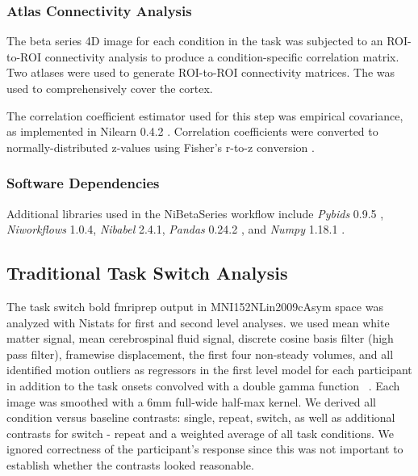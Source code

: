\documentclass[10pt,letterpaper]{article}
\begin{document}
\hypertarget{atlas-connectivity-analysis}{%
\subsubsection{Atlas Connectivity
Analysis}\label{atlas-connectivity-analysis}}

The beta series 4D image for each condition in the task was subjected to
an ROI-to-ROI connectivity analysis to produce a condition-specific
correlation matrix.
Two atlases were used to generate ROI-to-ROI connectivity matrices.
The \cite[Schaefer Atlas (400 parcels, 17 networks)]{Schaefer2017} was
used to comprehensively cover the cortex.

The correlation coefficient estimator used for this
step was empirical covariance, as implemented in Nilearn 0.4.2
\cite{Abraham2014}. Correlation coefficients were converted to
normally-distributed z-values using Fisher's r-to-z conversion
\cite{Fisher1915}.

\hypertarget{software-dependencies}{%
\subsubsection{Software Dependencies}\label{software-dependencies}}

Additional libraries used in the NiBetaSeries workflow include
\emph{Pybids} 0.9.5 \cite{Yarkoni2019}, \emph{Niworkflows} 1.0.4,
\emph{Nibabel} 2.4.1, \emph{Pandas} 0.24.2 \cite{McKinney2010}, and
\emph{Numpy} 1.18.1 \cite{VanDerWalt2011, Oliphant2006}.

\subsection*{Traditional Task Switch Analysis}
The task switch bold fmriprep output in MNI152NLin2009cAsym space
was analyzed with Nistats for first and second level analyses.
we used mean white matter signal, mean cerebrospinal fluid signal,
discrete cosine basis filter (high pass filter), framewise displacement, the first four non-steady volumes, and
all identified motion outliers as regressors in the first level model for each participant
in addition to the task onsets convolved with a double gamma function ~\cite{Glover1999}.
Each image was smoothed with a 6mm full-wide half-max kernel.
We derived all condition versus baseline contrasts: single, repeat, switch, as well as
additional contrasts for switch - repeat and a weighted average of all task conditions.
We ignored correctness of the participant's response since this was not important to
establish whether the contrasts looked reasonable.
\end{document}
